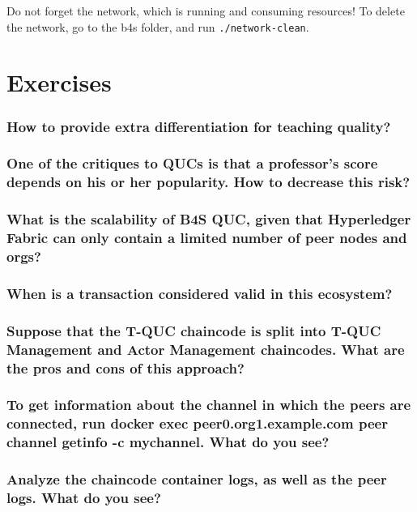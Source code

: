 \documentclass[12pt,a4paper]{article}
\theoremstyle{definition}
\begin{document}
    Do not forget the network, which is running and consuming resources! To delete the network, go to the b4s folder, and run \texttt{./network-clean}.


    \section{Exercises}


    \subsubsection*{How to provide extra differentiation for teaching quality?}


    \subsubsection*{One of the critiques to QUCs is that a professor's score depends on his or her popularity. How to decrease this risk?}


    \subsubsection*{What is the scalability of B4S QUC, given that Hyperledger Fabric can only contain a limited number of peer nodes and orgs?}


    \subsubsection*{When is a transaction considered valid in this ecosystem?}

    \subsubsection*{Suppose that the T-QUC chaincode is split into T-QUC Management and Actor Management chaincodes. What are the pros and cons of this approach?}


    \subsubsection*{To get information about the channel in which the peers are connected, run {docker exec peer0.org1.example.com peer channel getinfo -c mychannel}. What do you see?}



    \subsubsection*{Analyze the chaincode container logs, as well as the peer logs. What do you see?}
\end{document}
